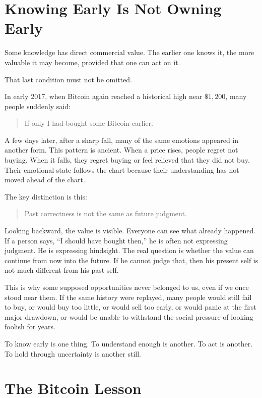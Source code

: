 \section*{Knowing Early Is Not Owning Early}

Some knowledge has direct commercial value. The earlier one knows it, the more valuable it may become, provided that one can act on it.

That last condition must not be omitted.

In early 2017, when Bitcoin again reached a historical high near \( \$1{,}200 \), many people suddenly said:

\begin{quote}
If only I had bought some Bitcoin earlier.
\end{quote}

A few days later, after a sharp fall, many of the same emotions appeared in another form. This pattern is ancient. When a price rises, people regret not buying. When it falls, they regret buying or feel relieved that they did not buy. Their emotional state follows the chart because their understanding has not moved ahead of the chart.

The key distinction is this:

\begin{quote}
Past correctness is not the same as future judgment.
\end{quote}

Looking backward, the value is visible. Everyone can see what already happened. If a person says, ``I should have bought then,'' he is often not expressing judgment. He is expressing hindsight. The real question is whether the value can continue from now into the future. If he cannot judge that, then his present self is not much different from his past self.

This is why some supposed opportunities never belonged to us, even if we once stood near them. If the same history were replayed, many people would still fail to buy, or would buy too little, or would sell too early, or would panic at the first major drawdown, or would be unable to withstand the social pressure of looking foolish for years.

To know early is one thing. To understand enough is another. To act is another. To hold through uncertainty is another still.

\section*{The Bitcoin Lesson}

